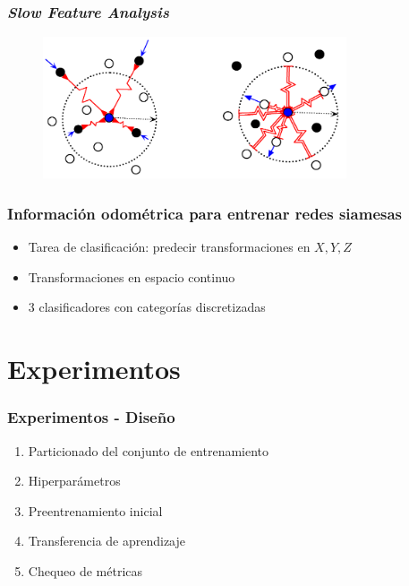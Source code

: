 \documentclass{beamer}
\begin{document}
\begin{frame}
\frametitle{\textit{Slow Feature Analysis}}
\begin{figure}
    \centering
    \includegraphics[width=0.8\textwidth]{images/example_contrastiveloss.png}
\end{figure}
\end{frame}





\begin{frame}
\frametitle{Información odométrica para entrenar redes siamesas}
\begin{itemize}
    \item Tarea de clasificación: predecir transformaciones en \(X, Y, Z\)
    \item Transformaciones en espacio continuo 
    \item 3 clasificadores con categorías discretizadas
\end{itemize}
\end{frame}





\section{Experimentos}
\begin{frame}
\frametitle{Experimentos - Diseño}
\begin{enumerate}
    \item Particionado del conjunto de entrenamiento
    \item Hiperparámetros
    \item Preentrenamiento inicial
    \item Transferencia de aprendizaje
    \item Chequeo de métricas
\end{enumerate}
\end{frame}
\end{document}
